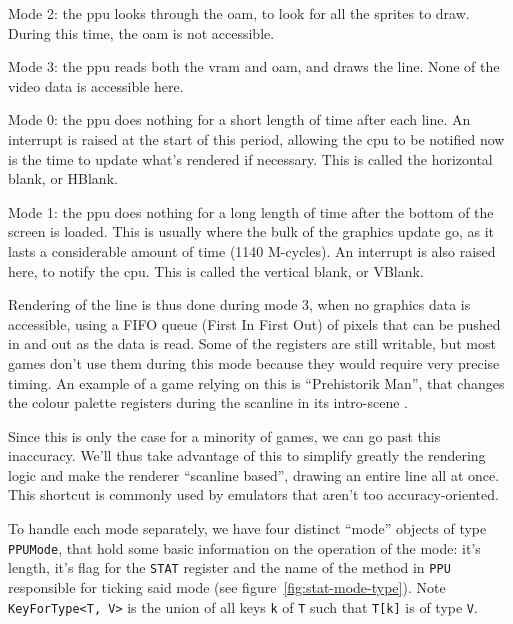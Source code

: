\documentclass[11pt]{informatics-report}
\begin{document}
\begin{compactitem}
	\item Mode 2: the \gls{ppu} looks through the \gls{oam}, to look for all the sprites to draw. During this time, the \gls{oam} is not accessible.
	\item Mode 3: the \gls{ppu} reads both the \gls{vram} and \gls{oam}, and draws the line. None of the video data is accessible here.
	\item Mode 0: the \gls{ppu} does nothing for a short length of time after each line. An interrupt is raised at the start of this period, allowing the \gls{cpu} to be notified now is the time to update what's rendered if necessary. This is called the horizontal blank, or HBlank.
	\item Mode 1: the \gls{ppu} does nothing for a long length of time after the bottom of the screen is loaded. This is usually where the bulk of the graphics update go, as it lasts a considerable amount of time (1140 M-cycles). An interrupt is also raised here, to notify the \gls{cpu}. This is called the vertical blank, or VBlank.
\end{compactitem}

Rendering of the line is thus done during mode 3, when no graphics data is accessible, using a FIFO queue (First In First Out) of pixels that can be pushed in and out as the data is read. Some of the registers are still writable, but most games don't use them during this mode because they would require very precise timing. An example of a game relying on this is ``Prehistorik Man'', that changes the colour palette registers during the scanline in its intro-scene \cite[Tricky-to-emulate games]{gbdev_wiki}.

Since this is only the case for a minority of games, we can go past this inaccuracy. We'll thus take advantage of this to simplify greatly the rendering logic and make the renderer ``scanline based'', drawing an entire line all at once. This shortcut is commonly used by emulators that aren't too accuracy-oriented.

To handle each mode separately, we have four distinct ``mode'' objects of type \texttt{PPUMode}, that hold some basic information on the operation of the mode: it's length, it's flag for the \texttt{STAT} register and the name of the method in \texttt{PPU} responsible for ticking said mode (see figure~\ref{fig:stat-mode-type}). Note \texttt{KeyForType<T, V>} is the union of all keys \texttt{k} of \texttt{T} such that \texttt{T[k]} is of type \texttt{V}.
\end{document}
